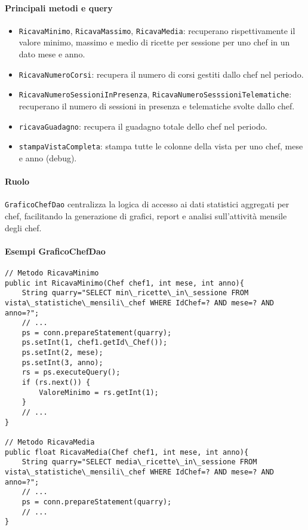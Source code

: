 \paragraph{Principali metodi e query}
\begin{itemize}
    \item \texttt{RicavaMinimo}, \texttt{RicavaMassimo}, \texttt{RicavaMedia}: recuperano rispettivamente il valore minimo, massimo e medio di ricette per sessione per uno chef in un dato mese e anno.
    \item \texttt{RicavaNumeroCorsi}: recupera il numero di corsi gestiti dallo chef nel periodo.
    \item \texttt{RicavaNumeroSessioniInPresenza}, \texttt{RicavaNumeroSesssioniTelematiche}: recuperano il numero di sessioni in presenza e telematiche svolte dallo chef.
    \item \texttt{ricavaGuadagno}: recupera il guadagno totale dello chef nel periodo.
    \item \texttt{stampaVistaCompleta}: stampa tutte le colonne della vista per uno chef, mese e anno (debug).
\end{itemize}

\paragraph{Ruolo}
\texttt{GraficoChefDao} centralizza la logica di accesso ai dati statistici aggregati per chef, facilitando la generazione di grafici, report e analisi sull'attività mensile degli chef.

\paragraph{Esempi GraficoChefDao}
\begin{verbatim}
// Metodo RicavaMinimo
public int RicavaMinimo(Chef chef1, int mese, int anno){
    String quarry="SELECT min\_ricette\_in\_sessione FROM vista\_statistiche\_mensili\_chef WHERE IdChef=? AND mese=? AND anno=?";
    // ...
    ps = conn.prepareStatement(quarry);
    ps.setInt(1, chef1.getId\_Chef());
    ps.setInt(2, mese);
    ps.setInt(3, anno);
    rs = ps.executeQuery();
    if (rs.next()) {
        ValoreMinimo = rs.getInt(1);
    }
    // ...
}

// Metodo RicavaMedia
public float RicavaMedia(Chef chef1, int mese, int anno){
    String quarry="SELECT media\_ricette\_in\_sessione FROM vista\_statistiche\_mensili\_chef WHERE IdChef=? AND mese=? AND anno=?";
    // ...
    ps = conn.prepareStatement(quarry);
    // ...
}
\end{verbatim}

